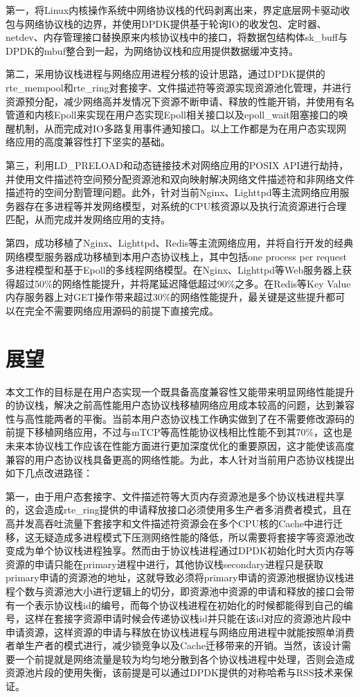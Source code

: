 第一，将Linux内核操作系统中网络协议栈的代码剥离出来，界定底层网卡驱动收包与网络协议栈的边界，并使用DPDK提供基于轮询IO的收发包、定时器、netdev、内存管理接口替换原来内核协议栈中的接口，将数据包结构体sk\_buff与DPDK的mbuf整合到一起，为网络协议栈和应用提供数据缓冲支持。

第二，采用协议栈进程与网络应用进程分核的设计思路，通过DPDK提供的rte\_mempool和rte\_ring对套接字、文件描述符等资源实现资源池化管理，并进行资源预分配，减少网络高并发情况下资源不断申请、释放的性能开销，并使用有名管道和内核Epoll来实现在用户态实现Epoll相关接口以及epoll\_wait阻塞接口的唤醒机制，从而完成对IO多路复用事件通知接口。以上工作都是为在用户态实现网络应用的高度兼容性打下坚实的基础。

第三，利用LD\_PRELOAD和动态链接技术对网络应用的POSIX API进行劫持，并使用文件描述符空间预分配资源池和双向映射解决网络文件描述符和非网络文件描述符的空间分割管理问题。此外，针对当前Nginx、Lighttpd等主流网络应用服务器存在多进程等并发网络模型，对系统的CPU核资源以及执行流资源进行合理匹配，从而完成并发网络应用的支持。

第四，成功移植了Nginx、Lighttpd、Redis等主流网络应用，并将自行开发的经典网络模型服务器成功移植到本用户态协议栈上，其中包括one process per request多进程模型和基于Epoll的多线程网络模型。在Nginx、Lighttpd等Web服务器上获得超过50\%的网络性能提升，并将尾延迟降低超过90\%之多。在Redis等Key Value内存服务器上对GET操作带来超过30\%的网络性能提升，最关键是这些提升都可以在完全不需要网络应用源码的前提下直接完成。

\section{展望}

本文工作的目标是在用户态实现一个既具备高度兼容性又能带来明显网络性能提升的协议栈，解决之前高性能用户态协议栈移植网络应用成本较高的问题，达到兼容性与高性能两者的平衡。当前本用户态协议栈工作确实做到了在不需要修改源码的前提下移植网络应用，不过与mTCP等高性能协议栈相比性能不到其70\%，这也是未来本协议栈工作应该在性能方面进行更加深度优化的重要原因，这才能使该高度兼容的用户态协议栈具备更高的网络性能。为此，本人针对当前用户态协议栈提出如下几点改进路径：

第一，由于用户态套接字、文件描述符等大页内存资源池是多个协议栈进程共享的，这会造成rte\_ring提供的申请释放接口必须使用多生产者多消费者模式，且在高并发高吞吐流量下套接字和文件描述符资源会在多个CPU核的Cache中进行迁移，这无疑造成多进程模式下压测网络性能的降低，所以需要将套接字等资源池改变成为单个协议栈进程独享。然而由于协议栈进程通过DPDK初始化时大页内存等资源的申请只能在primary进程中进行，其他协议栈secondary进程只是获取primary申请的资源池的地址，这就导致必须将primary申请的资源池根据协议栈进程个数与资源池大小进行逻辑上的切分，即资源池中资源的申请和释放的接口会带有一个表示协议栈id的编号，而每个协议栈进程在初始化的时候都能得到自己的编号，这样在套接字资源申请时候会传递协议栈id并只能在该id对应的资源池片段中申请资源，这样资源的申请与释放在协议栈进程与网络应用进程中就能按照单消费者单生产者的模式进行，减少锁竞争以及Cache迁移带来的开销。当然，该设计需要一个前提就是网络流量是较为均匀地分散到各个协议栈进程中处理，否则会造成资源池片段的使用失衡，该前提是可以通过DPDK提供的对称哈希与RSS技术来保证。

